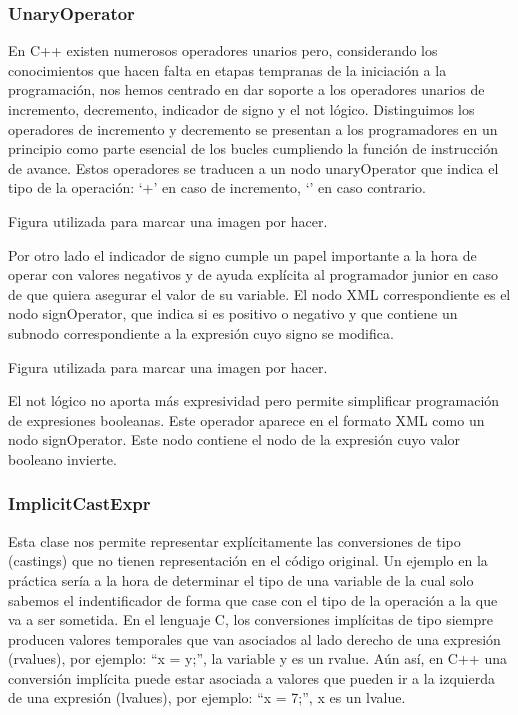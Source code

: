 \subsubsection*{UnaryOperator}

En C++ existen numerosos operadores unarios pero, considerando los conocimientos que hacen falta en etapas tempranas de la iniciación a la programación, nos hemos centrado en dar soporte a los operadores unarios de incremento, decremento, indicador de signo y el not lógico. Distinguimos los operadores de incremento y decremento se presentan a los programadores en un principio como parte esencial de los bucles cumpliendo la función de instrucción de avance. Estos operadores se traducen a un nodo unaryOperator que indica el tipo de la operación: ‘+’ en caso de incremento, ‘’ en caso contrario.

%
{Figura utilizada para marcar una imagen por hacer.}

Por otro lado el indicador de signo cumple un papel importante a la hora de operar con valores negativos y de ayuda explícita al programador junior en caso de que quiera asegurar el valor de su variable. El nodo XML correspondiente es el nodo signOperator, que indica si es positivo o negativo y que contiene un subnodo correspondiente a la expresión cuyo signo se modifica.

%
{Figura utilizada para marcar una imagen por hacer.}

El not lógico no aporta más expresividad pero permite simplificar programación de expresiones booleanas. Este operador aparece en el formato XML como un nodo signOperator. Este nodo contiene el nodo de la expresión cuyo valor booleano invierte.

\subsubsection*{ImplicitCastExpr}

Esta clase nos permite representar explícitamente las conversiones de tipo (castings) que no tienen representación en el código original. Un ejemplo en la práctica sería a la hora de determinar el tipo de una variable de la cual solo sabemos el indentificador de forma que case con el tipo de la operación a la que va a ser sometida. En el lenguaje C, los conversiones implícitas de tipo siempre producen valores temporales que van asociados al lado derecho de una expresión (rvalues), por ejemplo: ``x = y;'', la variable y es un rvalue. Aún así, en C++ una conversión implícita puede estar asociada a valores que pueden ir a la izquierda de una expresión (lvalues), por ejemplo: ``x = 7;'', x es un lvalue.

